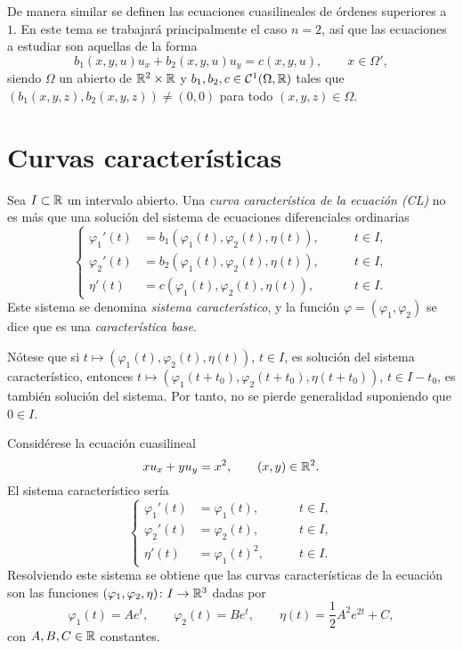 \documentclass[a4paper, 12pt, extrafontsizes]{memoir}
\begin{document}
De manera similar se definen las ecuaciones cuasilineales de órdenes superiores a $1$. En este tema se trabajará principalmente el caso $n = 2$, así que las ecuaciones a estudiar son aquellas de la forma
\[b_1(x,y,u)u_x+b_2(x,y,u)u_y = c(x,y,u), \qquad x \in \Omega', \tag{CL}\]
siendo $\Omega$ un abierto de $\mathbb R^2 \times \mathbb R$ y $b_1,b_2,c \in \mathcal{C}^1(\Omega,\mathbb R)$ tales que $(b_1(x,y,z),b_2(x,y,z)) \neq (0,0)$ para todo $(x,y,z) \in \Omega$.

\section{Curvas características}

\begin{definition}
    Sea $I \subset \mathbb R$ un intervalo abierto. Una \emph{curva característica de la ecuación \textup{(CL)}} no es más que una solución del sistema de ecuaciones diferenciales ordinarias
    \[
    \left\{\begin{alignedat}{2}
        \varphi_1'(t) &= b_1(\varphi_1(t),\varphi_2(t),\eta(t)), \qquad & t \in I, \\
        \varphi_2'(t) &= b_2(\varphi_1(t),\varphi_2(t),\eta(t)), \qquad & t \in I, \\
        \eta'(t) &= c(\varphi_1(t),\varphi_2(t),\eta(t)), \qquad & t \in I.
    \end{alignedat}\right.
    \]
    Este sistema se denomina \emph{sistema característico}, y la función $\varphi=(\varphi_1,\varphi_2)$ se dice que es una \emph{característica base}.
\end{definition}

Nótese que si $t \mapsto (\varphi_1(t),\varphi_2(t),\eta(t))$, $t \in I$, es solución del sistema característico, entonces $t \mapsto (\varphi_1(t+t_0),\varphi_2(t+t_0),\eta(t+t_0))$, $t \in I-t_0$, es también solución del sistema. Por tanto, no se pierde generalidad suponiendo que $0 \in I$.

\begin{example}
    Considérese la ecuación cuasilineal
    \[xu_x+yu_y=x^2, \qquad (x,y) \in \mathbb R^2.\]
    El sistema característico sería
    \[
    \left\{\begin{alignedat}{2}
        \varphi_1'(t) &= \varphi_1(t), \qquad & t \in I, \\
        \varphi_2'(t) &= \varphi_2(t), \qquad & t \in I, \\
        \eta'(t) &= \varphi_1(t)^2, \qquad & t \in I.
    \end{alignedat}\right.
    \]
    Resolviendo este sistema se obtiene que las curvas características de la ecuación son las funciones $(\varphi_1,\varphi_2,\eta) \colon I \to \mathbb R^3$ dadas por
    \[\varphi_1(t) = Ae^t, \qquad \varphi_2(t) = Be^t, \qquad \eta(t) = \frac{1}{2}A^2e^{2t}+C,\]
    con $A,B,C \in \mathbb R$ constantes.
\end{example}
\end{document}
